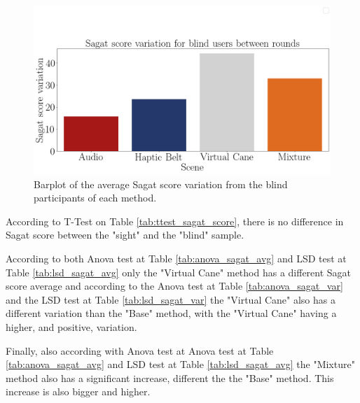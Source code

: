 



\begin{figure}[!htb]
    \centering
    \includegraphics[width = 0.8\linewidth]{Resultados/Sagat/Figuras/png/barplot_sagat_var_scene_blind.png}
    \caption{Barplot of the average Sagat score variation from the blind participants of each method.}
    \label{fig:barplot_sagat_var_scene_blind}
\end{figure}

According to T-Test on Table \ref{tab:ttest_sagat_score}, there is no difference in Sagat score between the "sight" and the "blind" sample.

According to both Anova test at Table \ref{tab:anova_sagat_avg} and LSD test at Table \ref{tab:lsd_sagat_avg} only the "Virtual Cane" method has a different Sagat score average and according to the Anova test at Table \ref{tab:anova_sagat_var} and the LSD test at Table \ref{tab:lsd_sagat_var} the "Virtual Cane" also has a different variation than the "Base" method, with the "Virtual Cane" having a higher, and positive, variation.

Finally, also according with Anova test at Anova test at Table \ref{tab:anova_sagat_avg} and LSD test at Table \ref{tab:lsd_sagat_avg} the "Mixture" method also has a significant increase, different the the "Base" method. This increase is also bigger and higher.

\FloatBarrier
